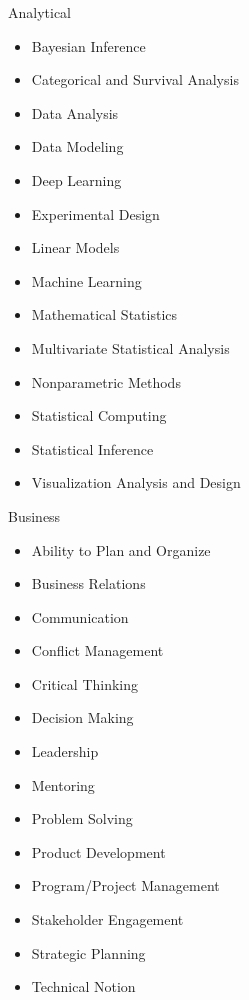 
\begin{multicols*}{3}
\Competencies
{Analytical}
{\begin{itemize}
    \item Bayesian Inference
    \item Categorical and Survival Analysis
    \item Data Analysis
    \item Data Modeling
    \item Deep Learning
    \item Experimental Design
    \item Linear Models
    \item Machine Learning
    \item Mathematical Statistics
    \item Multivariate Statistical Analysis
    \item Nonparametric Methods
    \item Statistical Computing
    \item Statistical Inference
    \item Visualization Analysis and Design
\end{itemize}}

\Competencies
{Business}
{\begin{itemize}
    \item Ability to Plan and Organize
    \item Business Relations
    \item Communication
    \item Conflict Management
    \item Critical Thinking
    \item Decision Making
    \item Leadership
    \item Mentoring
    \item Problem Solving
    \item Product Development
    \item Program/Project Management
    \item Stakeholder Engagement
    \item Strategic Planning
    \item Technical Notion
\end{itemize}}


\end{multicols*}
